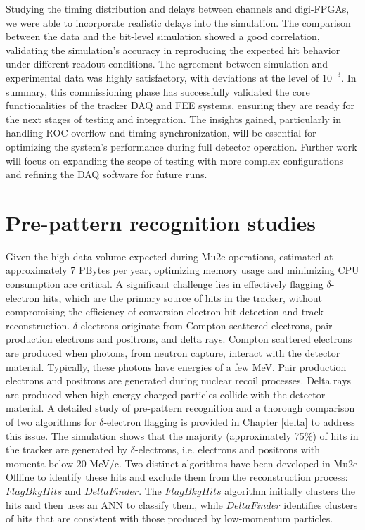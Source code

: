 Studying the timing distribution and delays between channels and digi-FPGAs, we were able to incorporate realistic delays into the simulation. 
The comparison between the data and the bit-level simulation showed a good correlation, 
validating the simulation's accuracy in reproducing the expected hit behavior under different readout conditions.
The agreement between simulation and experimental data was highly satisfactory, with deviations at the level of $10^{-3}$.
In summary, this commissioning phase has successfully validated the core functionalities of 
the tracker DAQ and FEE systems, ensuring they are ready for the next stages of testing and 
integration. The insights gained, particularly in handling ROC overflow and timing synchronization, 
will be essential for optimizing the system's performance during full detector operation. 
Further work will focus on expanding the scope of testing with more complex configurations 
and refining the DAQ software for future runs.


\section{Pre-pattern recognition studies}
Given the high data volume expected during Mu2e operations, estimated 
at approximately 7 PBytes per year, optimizing memory usage and minimizing 
CPU consumption are critical. A significant challenge lies in effectively 
flagging $\delta$-electron hits, which are the primary source of hits in 
the tracker, without compromising the efficiency of conversion electron 
hit detection and track reconstruction. $\delta$-electrons originate from 
Compton scattered electrons, pair production electrons and positrons, and 
delta rays. Compton scattered electrons are produced when photons, from 
neutron capture, interact with the detector material. Typically, these 
photons have energies of a few MeV. Pair production electrons and positrons 
are generated during nuclear recoil processes. Delta rays 
are produced when high-energy charged particles collide 
with the detector material. A detailed study of pre-pattern recognition 
and a thorough comparison of two algorithms for $\delta$-electron flagging is 
provided in Chapter \ref{delta} to address this issue.
The simulation shows that the majority 
(approximately 75\%) 
of hits in the tracker are generated by 
$\delta$-electrons, i.e. electrons 
and positrons with momenta below 20 MeV/c. 
Two distinct algorithms 
have been developed in Mu2e Offline to 
identify these hits and exclude 
them from the reconstruction process: 
$FlagBkgHits$ and $DeltaFinder$. 
The $FlagBkgHits$ algorithm initially 
clusters the hits and then uses an ANN 
to classify them, while $DeltaFinder$ 
identifies clusters of hits that are 
consistent with those produced by 
low-momentum particles.

